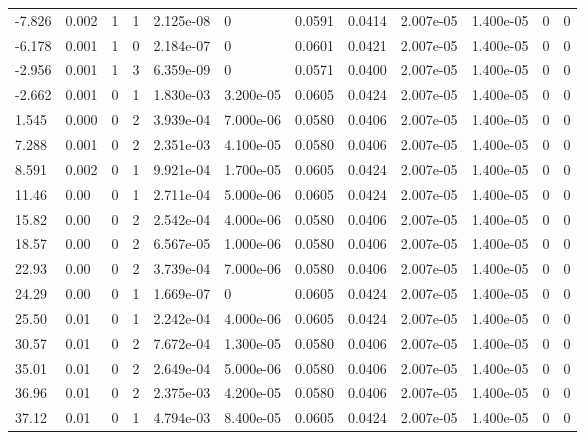 \documentclass[preview]{standalone}
\begin{document}
{{\begin{tabular}{L{1.2cm}C{1.2cm} C{0.3cm}C{0.5cm} C{1.4cm}C{1.4cm} C{1.4cm}C{1.4cm} C{1.6cm}C{1.6cm} C{1.6cm}C{1.6cm}}
  -7.826  &  0.002  & 1     &  1 &  2.125e-08  & 0  &  0.0591&   0.0414& 2.007e-05 & 1.400e-05   &  0 & 0  \\ 
  -6.178  &  0.001  & 1     &  0 &  2.184e-07  & 0  &  0.0601&   0.0421& 2.007e-05 & 1.400e-05   &  0 & 0  \\ 
  -2.956  &  0.001  & 1     &  3 &  6.359e-09  & 0  &  0.0571&   0.0400& 2.007e-05 & 1.400e-05   &  0 & 0  \\ 
  -2.662  &  0.001  & 0     &  1 &  1.830e-03  & 3.200e-05  &  0.0605&   0.0424& 2.007e-05 & 1.400e-05   &  0 & 0  \\ 
  1.545  &  0.000  & 0     &  2 &  3.939e-04  & 7.000e-06  &  0.0580&   0.0406& 2.007e-05 & 1.400e-05   &  0 & 0  \\ 
  7.288  &  0.001  & 0     &  2 &  2.351e-03  & 4.100e-05  &  0.0580&   0.0406& 2.007e-05 & 1.400e-05   &  0 & 0  \\ 
  8.591  &  0.002  & 0     &  1 &  9.921e-04  & 1.700e-05  &  0.0605&   0.0424& 2.007e-05 & 1.400e-05   &  0 & 0  \\ 
  11.46  &  0.00  & 0     &  1 &  2.711e-04  & 5.000e-06  &  0.0605&   0.0424& 2.007e-05 & 1.400e-05   &  0 & 0  \\ 
  15.82  &  0.00  & 0     &  2 &  2.542e-04  & 4.000e-06  &  0.0580&   0.0406& 2.007e-05 & 1.400e-05   &  0 & 0  \\ 
  18.57  &  0.00  & 0     &  2 &  6.567e-05  & 1.000e-06  &  0.0580&   0.0406& 2.007e-05 & 1.400e-05   &  0 & 0  \\ 
  22.93  &  0.00  & 0     &  2 &  3.739e-04  & 7.000e-06  &  0.0580&   0.0406& 2.007e-05 & 1.400e-05   &  0 & 0  \\ 
  24.29  &  0.00  & 0     &  1 &  1.669e-07  & 0  &  0.0605&   0.0424& 2.007e-05 & 1.400e-05   &  0 & 0  \\ 
  25.50  &  0.01  & 0     &  1 &  2.242e-04  & 4.000e-06  &  0.0605&   0.0424& 2.007e-05 & 1.400e-05   &  0 & 0  \\ 
  30.57  &  0.01  & 0     &  2 &  7.672e-04  & 1.300e-05  &  0.0580&   0.0406& 2.007e-05 & 1.400e-05   &  0 & 0  \\ 
  35.01  &  0.01  & 0     &  2 &  2.649e-04  & 5.000e-06  &  0.0580&   0.0406& 2.007e-05 & 1.400e-05   &  0 & 0  \\ 
  36.96  &  0.01  & 0     &  2 &  2.375e-03  & 4.200e-05  &  0.0580&   0.0406& 2.007e-05 & 1.400e-05   &  0 & 0  \\ 
  37.12  &  0.01  & 0     &  1 &  4.794e-03  & 8.400e-05  &  0.0605&   0.0424& 2.007e-05 & 1.400e-05   &  0 & 0  \\ 

\end{tabular}}}
\end{document}
